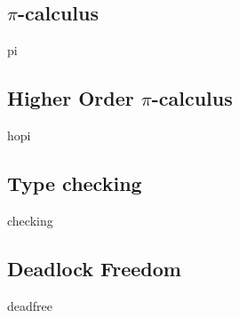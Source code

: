 \subsection{\texorpdfstring{$\pi$}{pi}-calculus}
{pi}

\subsection{Higher Order \texorpdfstring{$\pi$}{pi}-calculus}
{hopi}

\subsection{Type checking}
{checking}

\subsection{Deadlock Freedom}
{deadfree}